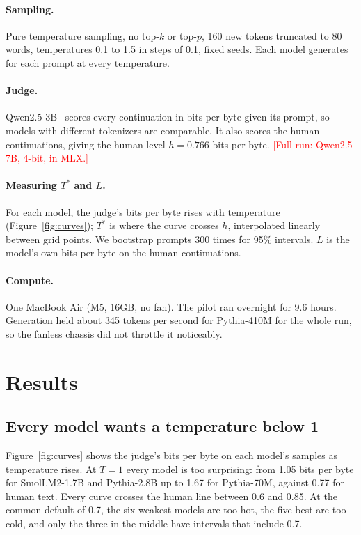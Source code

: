 \documentclass[10pt]{article}
\newcommand{\todo}[1]{\textcolor{red}{[#1]}}
\newcommand{\Ts}{T^{*}}
\begin{document}
\paragraph{Sampling.} Pure temperature sampling, no top-$k$ or top-$p$, 160 new tokens truncated to 80 words, temperatures 0.1 to 1.5 in steps of 0.1, fixed seeds. Each model generates for each prompt at every temperature.

\paragraph{Judge.} Qwen2.5-3B~\citep{qwen2025qwen25} scores every continuation in bits per byte given its prompt, so models with different tokenizers are comparable. It also scores the human continuations, giving the human level $h = 0.766$ bits per byte. \todo{Full run: Qwen2.5-7B, 4-bit, in MLX.}

\paragraph{Measuring $\Ts$ and $L$.} For each model, the judge's bits per byte rises with temperature (Figure~\ref{fig:curves}); $\Ts$ is where the curve crosses $h$, interpolated linearly between grid points. We bootstrap prompts 300 times for 95\% intervals. $L$ is the model's own bits per byte on the human continuations.

\paragraph{Compute.} One MacBook Air (M5, 16GB, no fan). The pilot ran overnight for 9.6 hours. Generation held about 345 tokens per second for Pythia-410M for the whole run, so the fanless chassis did not throttle it noticeably.

\section{Results}
\label{sec:results}

\subsection{Every model wants a temperature below 1}

Figure~\ref{fig:curves} shows the judge's bits per byte on each model's samples as temperature rises. At $T = 1$ every model is too surprising: from 1.05 bits per byte for SmolLM2-1.7B and Pythia-2.8B up to 1.67 for Pythia-70M, against 0.77 for human text. Every curve crosses the human line between 0.6 and 0.85. At the common default of 0.7, the six weakest models are too hot, the five best are too cold, and only the three in the middle have intervals that include 0.7.
\end{document}
